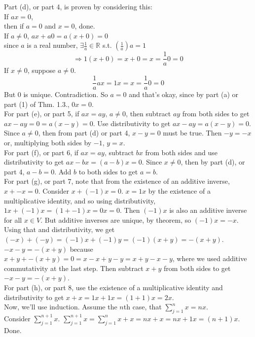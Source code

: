 \documentclass[twoside]{amsart}
\theoremstyle{plain}
\theoremstyle{definition}
\begin{document}
Part (d), or part 4, is proven by considering this: \\
If $ax =0$, \\
\quad then if $a=0$ and $x=0$, done.  \\
If $a\neq 0$, 
\quad $ax + a0 = a(x+0) =0$ \\
since $a$ is a real number, $\exists \frac{1}{a} \in \mathbb{R}$ s.t. $\left(\frac{1}{a} \right) a = 1$ 
\[
\Longrightarrow 1(x+0) = x+0 = x = \frac{1}{a} 0 =0
\]
If $x\neq 0$, suppose $a\neq 0$.  
\[
\frac{1}{a} ax = 1x = x = \frac{1}{a} 0 = 0 
\]
But $0$ is unique.  Contradiction.  So $a=0$ and that's okay, since by part (a) or part (1) of Thm. 1.3., $0x =0$.  \\

For part (e), or part 5, if $ax=ay, \, a\neq 0$, then subtract $ay$ from both sides to get $ax - ay =0 = a(x-y) =0$.  Use distributivity to get $ax-ay = a(x-y) = 0$.  Since $a\neq 0$, then from part (d) or part 4, $x-y=0$ must be true.  Then $-y = -x$ or, multiplying both sides by $-1$, $y=x$.   \\

For part (f), or part 6, if $ax=ay$, subtract $bx$ from both sides and use distributivity to get $ax-bx = (a-b)x = 0$.  Since $x \neq 0$, then by part (d), or part 4, $a-b=0$.  Add $b$ to both sides to get $a=b$.   \\

For part (g), or part 7, note that from the existence of an additive inverse, $x + -x =0$.  Consider $x + (-1)x =0$.  $x=1x$ by the existence of a multiplicative identity, and so using distributivity, $1x + (-1)x = (1+-1)x = 0x =0$.  Then $(-1)x$ is also an additive inverse for all $x \in V$.  But additive inverses are unique, by theorem, so $(-1)x = -x$.  Using that and distributivity, we get $(-x)+(-y) = (-1)x + (-1)y = (-1)(x+y) = -(x+y)$.  $-x-y = -(x+y)$ because \\
$x+y + -(x+y) = 0 = x - x + y -y = x +y -x -y $, where we used additive commutativity at the last step.  Then subtract $x+y$ from both sides to get $-x-y = -(x+y)$.   \\

For part (h), or part 8, use the existence of a multiplicative identity and distributivity to get $x+x = 1x +1x = (1+1)x = 2x$.  \\
Now, we'll use induction.  Assume the $n$th case, that $\sum_{j=1}^n x = nx$.  \\
Consider $\sum_{j=1}^{n+1}x$.  $\sum_{j=1}^{n+1}x = \sum_{j=1}^n x + x = nx+x = nx+1x = (n+1)x$.  Done.  
\end{document}
